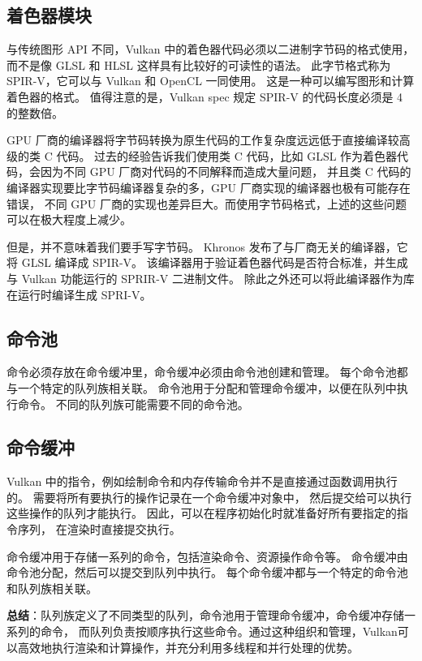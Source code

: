 \documentclass[a4paper, 12pt]{ctexart}
\begin{document}
\clearpage
\subsection{着色器模块}
    与传统图形 API 不同，Vulkan 中的着色器代码必须以二进制字节码的格式使用，
    而不是像 GLSL 和 HLSL 这样具有比较好的可读性的语法。
    此字节格式称为 SPIR-V，它可以与 Vulkan 和 OpenCL 一同使用。
    这是一种可以编写图形和计算着色器的格式。
    值得注意的是，Vulkan spec 规定 SPIR-V 的代码长度必须是 4 的整数倍。

    GPU 厂商的编译器将字节码转换为原生代码的工作复杂度远远低于直接编译较高级的类 C 代码。
    过去的经验告诉我们使用类 C 代码，比如 GLSL 作为着色器代码，会因为不同 GPU 厂商对代码的不同解释而造成大量问题，
    并且类 C 代码的编译器实现要比字节码编译器复杂的多，GPU 厂商实现的编译器也极有可能存在错误，
    不同 GPU 厂商的实现也差异巨大。而使用字节码格式，上述的这些问题可以在极大程度上减少。

    但是，并不意味着我们要手写字节码。
    Khronos 发布了与厂商无关的编译器，它将 GLSL 编译成 SPIR-V。
    该编译器用于验证着色器代码是否符合标准，并生成与 Vulkan 功能运行的 SPRIR-V 二进制文件。
    除此之外还可以将此编译器作为库在运行时编译生成 SPRI-V。


\clearpage
\subsection{命令池}
    命令必须存放在命令缓冲里，命令缓冲必须由命令池创建和管理。
    每个命令池都与一个特定的队列族相关联。
    命令池用于分配和管理命令缓冲，以便在队列中执行命令。
    不同的队列族可能需要不同的命令池。


\clearpage
\subsection{命令缓冲}
    Vulkan 中的指令，例如绘制命令和内存传输命令并不是直接通过函数调用执行的。
    需要将所有要执行的操作记录在一个命令缓冲对象中，
    然后提交给可以执行这些操作的队列才能执行。
    因此，可以在程序初始化时就准备好所有要指定的指令序列，
    在渲染时直接提交执行。

    命令缓冲用于存储一系列的命令，包括渲染命令、资源操作命令等。
    命令缓冲由命令池分配，然后可以提交到队列中执行。
    每个命令缓冲都与一个特定的命令池和队列族相关联。

    \textbf{总结}：队列族定义了不同类型的队列，命令池用于管理命令缓冲，命令缓冲存储一系列的命令，
    而队列负责按顺序执行这些命令。通过这种组织和管理，Vulkan可以高效地执行渲染和计算操作，并充分利用多线程和并行处理的优势。
\end{document}
